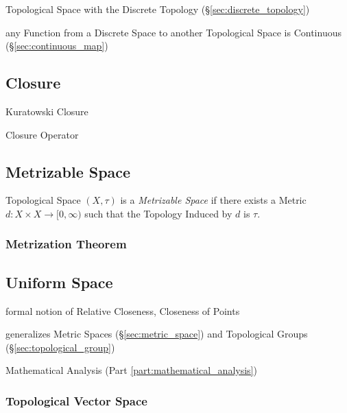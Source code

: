 Topological Space with the Discrete Topology (\S\ref{sec:discrete_topology})

any Function from a Discrete Space to another Topological Space is Continuous
(\S\ref{sec:continuous_map})


\subsection{Closure}\label{sec:closure}

Kuratowski Closure

Closure Operator



\subsection{Metrizable Space}\label{sec:metrizable_space}

Topological Space $(X, \tau)$ is a \emph{Metrizable Space} if there
exists a Metric $d : X \times X \rightarrow [0, \infty)$ such that the
  Topology Induced by $d$ is $\tau$.



\subsubsection{Metrization Theorem}\label{sec:metrization_theorem}



\subsection{Uniform Space}\label{sec:uniform_space}

formal notion of Relative Closeness, Closeness of Points

generalizes Metric Spaces (\S\ref{sec:metric_space}) and Topological
Groups (\S\ref{sec:topological_group})

Mathematical Analysis (Part \ref{part:mathematical_analysis})



\subsubsection{Topological Vector Space}\label{sec:topological_vector}

